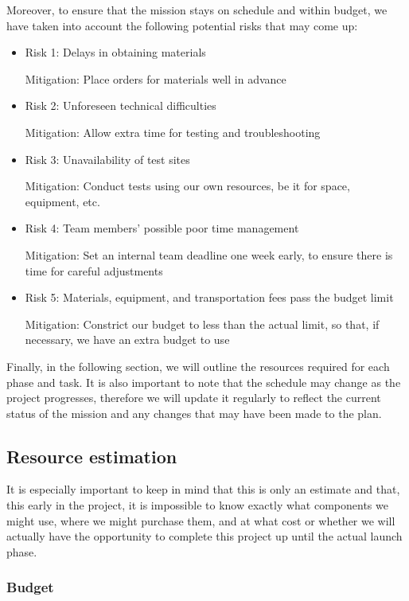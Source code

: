 Moreover, to ensure that the mission stays on schedule and within budget, we have taken into account the following potential risks that may come up:

\begin{itemize}

    \item Risk 1: Delays in obtaining materials
    \par Mitigation: Place orders for materials well in advance
    \item Risk 2: Unforeseen technical difficulties
    \par Mitigation: Allow extra time for testing and troubleshooting
    \item Risk 3: Unavailability of test sites
    \par Mitigation: Conduct tests using our own resources, be it for space, equipment, etc.
    \item Risk 4: Team members' possible poor time management
    \par Mitigation: Set an internal team deadline one week early, to ensure there is time for careful adjustments
    \item Risk 5: Materials, equipment, and transportation fees pass the budget limit
    \par Mitigation: Constrict our budget to less than the actual limit, so that, if necessary, we have an extra budget to use

\end{itemize}

Finally, in the following section, we will outline the resources required for each phase and task. It is also important to note that the schedule may change as the project progresses, therefore we will update it regularly to reflect the current status of the mission and any changes that may have been made to the plan.

\subsection{Resource estimation}

It is especially important to keep in mind that this is only an estimate and that, this early in the project, it is impossible to know exactly what components we might use, where we might purchase them, and at what cost or whether we will actually have the opportunity to complete this project up until the actual launch phase.

\subsubsection{Budget}


